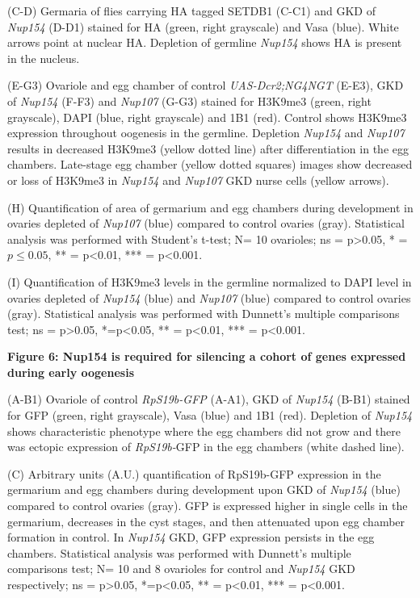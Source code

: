 \documentclass[12pt,oneside]{reedthesis}
\begin{document}
(C-D) Germaria of flies carrying HA tagged SETDB1 (C-C1) and GKD of
\emph{Nup154} (D-D1) stained for HA (green, right grayscale) and Vasa (blue).
White arrows point at nuclear HA. Depletion of germline \emph{Nup154} shows
HA is present in the nucleus.

(E-G3) Ovariole and egg chamber of control \emph{UAS-Dcr2;NG4NGT} (E-E3), GKD
of \emph{Nup154} (F-F3) and \emph{Nup107} (G-G3) stained for H3K9me3 (green, right
grayscale), DAPI (blue, right grayscale) and 1B1 (red). Control shows
H3K9me3 expression throughout oogenesis in the germline. Depletion
\emph{Nup154} and \emph{Nup107} results in decreased H3K9me3 (yellow dotted line)
after differentiation in the egg chambers. Late-stage egg chamber
(yellow dotted squares) images show decreased or loss of H3K9me3 in
\emph{Nup154} and \emph{Nup107} GKD nurse cells (yellow arrows).

(H) Quantification of area of germarium and egg chambers during
development in ovaries depleted of \emph{Nup107} (blue) compared to control
ovaries (gray). Statistical analysis was performed with Student's
t-test; N= 10 ovarioles; ns = p\textgreater0.05, * = \(p \le 0.05\), ** = p\textless0.01,
*** = p\textless0.001.

(I) Quantification of H3K9me3 levels in the germline normalized to DAPI
level in ovaries depleted of \emph{Nup154} (blue) and \emph{Nup107} (blue)
compared to control ovaries (gray). Statistical analysis was performed
with Dunnett's multiple comparisons test; ns = p\textgreater0.05, *=p\textless0.05,
** = p\textless0.01, *** = p\textless0.001.

\textbf{Figure 6: Nup154 is required for silencing a cohort of genes expressed
during early oogenesis}

(A-B1) Ovariole of control \emph{RpS19b-GFP} (A-A1), GKD of \emph{Nup154} (B-B1)
stained for GFP (green, right grayscale), Vasa (blue) and 1B1 (red).
Depletion of \emph{Nup154} shows characteristic phenotype where the egg
chambers did not grow and there was ectopic expression of \emph{RpS19b-}GFP
in the egg chambers (white dashed line).

(C) Arbitrary units (A.U.) quantification of RpS19b-GFP expression in
the germarium and egg chambers during development upon GKD of \emph{Nup154}
(blue) compared to control ovaries (gray). GFP is expressed higher in
single cells in the germarium, decreases in the cyst stages, and then
attenuated upon egg chamber formation in control. In \emph{Nup154} GKD, GFP
expression persists in the egg chambers. Statistical analysis was
performed with Dunnett's multiple comparisons test; N= 10 and 8
ovarioles for control and \emph{Nup154} GKD respectively; ns = p\textgreater0.05,
*=p\textless0.05, ** = p\textless0.01, *** = p\textless0.001.
\end{document}
